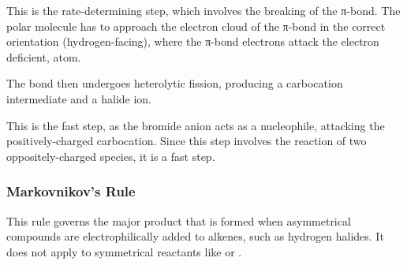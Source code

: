 		This is the rate-determining step, which involves the breaking of the π-bond. The polar  molecule has to
		approach the electron cloud of the π-bond in the correct orientation (hydrogen-facing), where the π-bond electrons
		attack the electron deficient,  atom.

		The  bond then undergoes heterolytic fission, producing a carbocation intermediate and a halide ion.


		\pagebreak


		This is the fast step, as the bromide anion acts as a nucleophile, attacking the positively-charged carbocation.
		Since this step involves the reaction of two oppositely-charged species, it is a fast step.


		\vspace{1.0em}




	\subsubsection{Markovnikov's Rule}

		This rule governs the major product that is formed when asymmetrical compounds are electrophilically added to alkenes,
		such as hydrogen halides. It does not apply to symmetrical reactants like  or .

